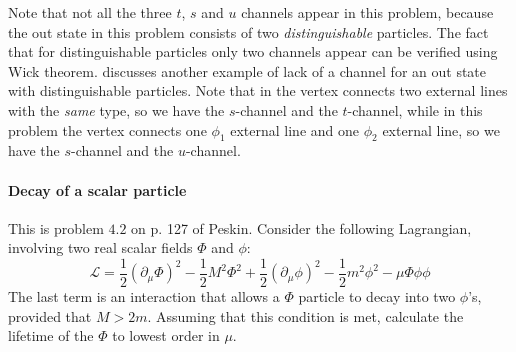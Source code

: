 \documentclass[hyperref, a4paper]{article}
\begin{document}
\begin{warning*}{}{}
    Note that not all the three $t$, $s$ and $u$ channels appear in this problem, 
    because the out state in this problem consists of two \emph{distinguishable} particles.
    The fact that for distinguishable particles only two channels appear can be verified using Wick theorem.
    \cite{stackexchange-answer} discusses another example of lack of a channel for an out state with 
    distinguishable particles. Note that in \cite{stackexchange-answer} the vertex connects two external 
    lines with the \emph{same} type, so we have the $s$-channel and the $t$-channel, while in this problem 
    the vertex connects one $\phi_1$ external line and one $\phi_2$ external line, 
    so we have the $s$-channel and the $u$-channel.
\end{warning*}

\paragraph{}

\paragraph{Decay of a scalar particle} This is problem $4.2$ on p. 127 of Peskin. 
Consider the following Lagrangian, involving two real scalar fields $\Phi$ and $\phi$:
\[
\mathcal{L}=\frac{1}{2}\left(\partial_{\mu} \Phi\right)^{2}-\frac{1}{2} M^{2} \Phi^{2}+\frac{1}{2}\left(\partial_{\mu} \phi\right)^{2}-\frac{1}{2} m^{2} \phi^{2}-\mu \Phi \phi \phi
\]
The last term is an interaction that allows a $\Phi$ particle to decay into two $\phi$'s, provided that $M>2 m$.
Assuming that this condition is met, calculate the lifetime of the $\Phi$ to lowest order in $\mu$.
\end{document}
